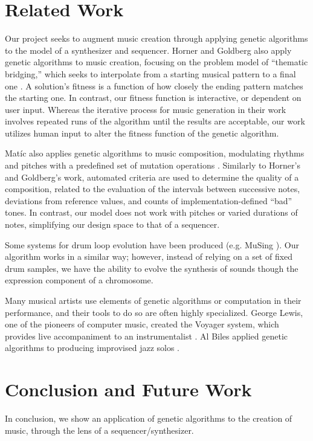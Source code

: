 \documentclass[conference]{IEEEtran}
\begin{document}
\section{Related Work}

Our project seeks to augment music creation through applying genetic algorithms
to the model of a synthesizer and sequencer. Horner and Goldberg also apply
genetic algorithms to music creation, focusing on the problem model of
``thematic bridging,'' which seeks to interpolate from a starting musical
pattern to a final one \cite{horner}. A solution's fitness is a
function of how closely the ending pattern matches the starting one. In
contrast, our fitness function is interactive, or dependent on user input.
Whereas the iterative process for music generation in their work involves
repeated runs of the algorithm until the results are acceptable, our work
utilizes human input to alter the fitness function of the genetic algorithm.

Matíc also applies genetic algorithms to music composition, modulating rhythms
and pitches with a predefined set of mutation operations
\cite{matic}. Similarly to Horner's and Goldberg's work, automated
criteria are used to determine the quality of a composition, related to the
evaluation of the intervals between successive notes, deviations from reference
values, and counts of implementation-defined ``bad'' tones. In contrast, our
model does not work with pitches or varied durations of notes, simplifying our
design space to that of a sequencer.

Some systems for drum loop evolution have been produced (e.g. MuSing
\cite{musing}). Our algorithm works in a similar way; however,
instead of relying on a set of fixed drum samples, we have the ability to
evolve the synthesis of sounds though the expression component of a chromosome.

Many musical artists use elements of genetic algorithms or computation in their
performance, and their tools to do so are often highly specialized. George
Lewis, one of the pioneers of computer music, created the Voyager system, which
provides live accompaniment to an instrumentalist \cite{voyager}. Al
Biles applied genetic algorithms to producing improvised jazz solos
\cite{genjazz}.

\section{Conclusion and Future Work}

In conclusion, we show an application of genetic algorithms to the creation of
music, through the lens of a sequencer/synthesizer.
\end{document}

